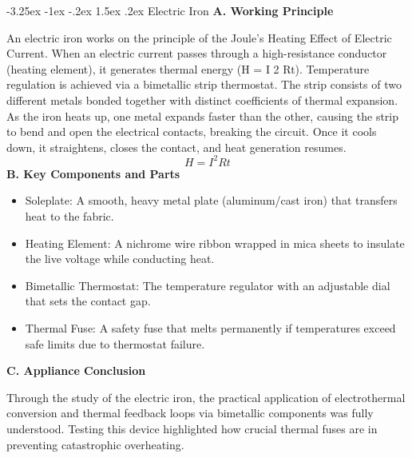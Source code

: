 \documentclass[11pt,a4paper]{report}
\makeatletter
\renewcommand{\section}{\@startsection{section}{1}{\z@}%
  {-3.25ex \@plus -1ex \@minus -.2ex}%
  {1.5ex \@plus.2ex}%
  {\normalfont\Large\bfseries\color{primaryColor}}}
\makeatother
\begin{document}
\section{Electric Iron}
\noindent\textbf{A. Working Principle}\par\medskip
An electric iron works on the principle of the Joule's Heating Effect of Electric Current. When an electric current passes through a high-resistance conductor (heating element), it generates thermal energy (H = I 2 Rt). Temperature regulation is achieved via a bimetallic strip thermostat. The strip consists of two different metals bonded together with distinct coefficients of thermal expansion. As the iron heats up, one metal expands faster than the other, causing the strip to bend and open the electrical contacts, breaking the circuit. Once it cools down, it straightens, closes the contact, and heat generation resumes.
\begin{equation}H = I^2 R t\end{equation}
\noindent\textbf{B. Key Components and Parts}\par\medskip
\begin{itemize}
  \item Soleplate: A smooth, heavy metal plate (aluminum/cast iron) that transfers heat to the fabric.
  \item Heating Element: A nichrome wire ribbon wrapped in mica sheets to insulate the live voltage while conducting heat.
  \item Bimetallic Thermostat: The temperature regulator with an adjustable dial that sets the contact gap.
  \item Thermal Fuse: A safety fuse that melts permanently if temperatures exceed safe limits due to thermostat failure.
\end{itemize}
\noindent\textbf{C. Appliance Conclusion}\par\medskip
Through the study of the electric iron, the practical application of electrothermal conversion and thermal feedback loops via bimetallic components was fully understood. Testing this device highlighted how crucial thermal fuses are in preventing catastrophic overheating.
\end{document}

